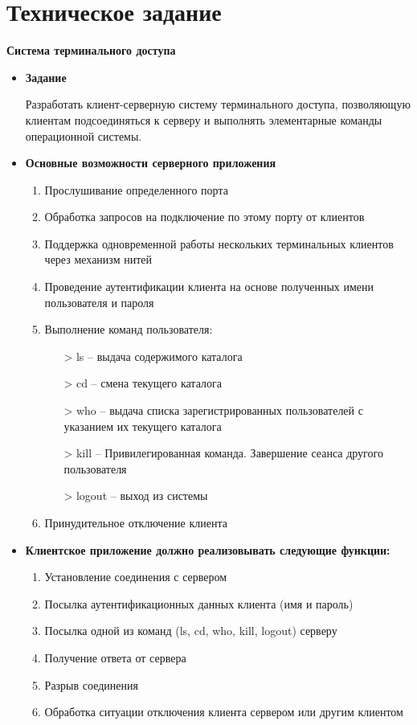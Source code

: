 





\tableofcontents
\newpage

\section{Техническое задание}
\textbf{Система терминального доступа}
\begin{itemize}

\item \textbf{Задание}

\hspace{14pt} Разработать клиент-серверную систему терминального доступа, позволяющую клиентам подсоединяться к серверу и выполнять элементарные команды операционной системы.

\item \textbf{Основные возможности серверного приложения}
\begin{enumerate}
\item Прослушивание определенного порта
\item Обработка запросов на подключение по этому порту от клиентов
\item Поддержка одновременной работы нескольких терминальных клиентов через механизм нитей
\item Проведение аутентификации клиента на основе полученных имени пользователя и пароля

\item Выполнение команд пользователя:
\begin{itemize}
\item[>] ls – выдача содержимого каталога
\item[>] cd – смена текущего каталога
\item[>] who – выдача списка зарегистрированных пользователей с указанием их текущего каталога
\item[>] kill – Привилегированная команда. Завершение сеанса другого пользователя
\item[>] logout – выход из системы
\end{itemize}

\item Принудительное отключение клиента
\end{enumerate}

\item \textbf{Клиентское приложение должно реализовывать следующие функции:}
\begin{enumerate}
\item Установление соединения с сервером
\item Посылка аутентификационных данных клиента (имя и пароль)
\item Посылка одной из команд (ls, cd, who, kill, logout) серверу
\item Получение ответа от сервера
\item Разрыв соединения
\item Обработка ситуации отключения клиента сервером или другим клиентом
\end{enumerate}


\end{itemize}
